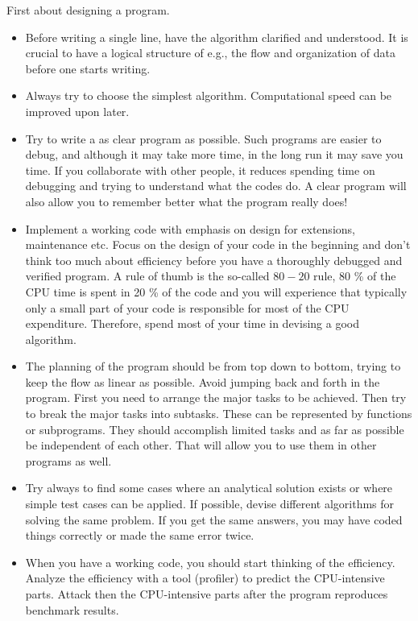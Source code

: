 First about designing a program.
\begin{itemize}
%
\item Before writing a single line, have the algorithm clarified and 
understood. It is crucial to have a logical structure of e.g., the flow 
and organization of data before one starts writing.

%
\item Always try  to choose the simplest algorithm. Computational speed
can be improved upon later.
%
\item Try to write a as clear program as possible. Such programs are
easier to debug, and although it may take more time, in the long run
it may save you time. If you collaborate with other people, it 
reduces spending time on debugging and
trying to understand what the codes do. A clear program will also allow
you to remember better what the program really does!

\item Implement a working code with emphasis on design for
extensions, maintenance etc.
Focus on the design of your code in the beginning and 
don't think too much about efficiency before you have a thoroughly
debugged and verified program.   A rule of thumb is the so-called 
$80-20$ rule,  80 \% of the CPU time is spent in 20 \% of the code
and you will experience that typically only a small part of your code
is responsible for most of the CPU expenditure.
Therefore, spend most of your time in devising a good algorithm.


% 
\item The planning of the program should be from top down to bottom,
trying to keep the flow as linear as possible. Avoid jumping back and
forth in the program. First you need to arrange the major tasks to be
achieved. Then try to break the major tasks into subtasks. These can be
represented by functions or subprograms. They should accomplish limited tasks
and as far as possible be independent of each other.  That will allow
you to use them in other programs as well.
%
\item Try always to find some cases where an analytical solution
exists or where simple test cases can be applied. 
If possible, devise different algorithms for solving
the same problem. If you get the same answers, you may have 
coded things correctly or made the same error twice.

\item When you have a working code, you should start thinking of the efficiency. 
Analyze the efficiency with a tool (profiler) to predict the
CPU-intensive parts. Attack then the CPU-intensive parts after the program reproduces
benchmark results.

\end{itemize}

